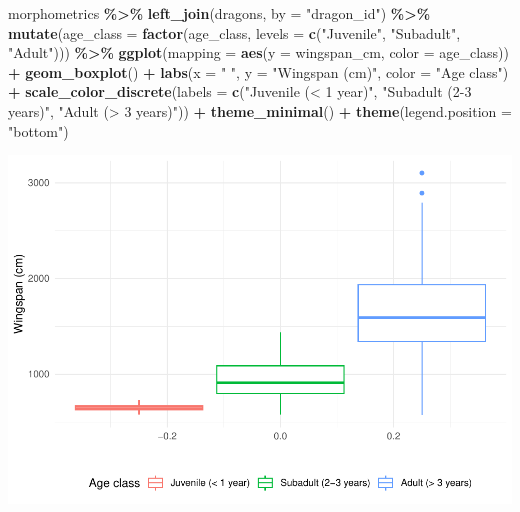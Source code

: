 \documentclass[
]{book}
\newenvironment{Shaded}{\begin{snugshade}}{\end{snugshade}}
\newcommand{\AttributeTok}[1]{\textcolor[rgb]{0.13,0.29,0.53}{#1}}
\newcommand{\FunctionTok}[1]{\textcolor[rgb]{0.13,0.29,0.53}{\textbf{#1}}}
\newcommand{\NormalTok}[1]{#1}
\newcommand{\SpecialCharTok}[1]{\textcolor[rgb]{0.81,0.36,0.00}{\textbf{#1}}}
\newcommand{\StringTok}[1]{\textcolor[rgb]{0.31,0.60,0.02}{#1}}
\begin{document}
\begin{Shaded}
\begin{Highlighting}[]
\NormalTok{morphometrics }\SpecialCharTok{\%\textgreater{}\%} 
  \FunctionTok{left\_join}\NormalTok{(dragons, }\AttributeTok{by =} \StringTok{"dragon\_id"}\NormalTok{) }\SpecialCharTok{\%\textgreater{}\%} 
  \FunctionTok{mutate}\NormalTok{(}\AttributeTok{age\_class =} \FunctionTok{factor}\NormalTok{(age\_class, }\AttributeTok{levels =} \FunctionTok{c}\NormalTok{(}\StringTok{"Juvenile"}\NormalTok{,}
                                                  \StringTok{"Subadult"}\NormalTok{,}
                                                  \StringTok{"Adult"}\NormalTok{))) }\SpecialCharTok{\%\textgreater{}\%} 
\FunctionTok{ggplot}\NormalTok{(}\AttributeTok{mapping =} \FunctionTok{aes}\NormalTok{(}\AttributeTok{y =}\NormalTok{ wingspan\_cm, }\AttributeTok{color =}\NormalTok{ age\_class)) }\SpecialCharTok{+}
  \FunctionTok{geom\_boxplot}\NormalTok{() }\SpecialCharTok{+}
  \FunctionTok{labs}\NormalTok{(}\AttributeTok{x =} \StringTok{" "}\NormalTok{, }\AttributeTok{y =} \StringTok{"Wingspan (cm)"}\NormalTok{, }\AttributeTok{color =} \StringTok{"Age class"}\NormalTok{) }\SpecialCharTok{+}
  \FunctionTok{scale\_color\_discrete}\NormalTok{(}\AttributeTok{labels =} \FunctionTok{c}\NormalTok{(}\StringTok{"Juvenile (\textless{} 1 year)"}\NormalTok{,}
                                 \StringTok{"Subadult (2{-}3 years)"}\NormalTok{,}
                                 \StringTok{"Adult (\textgreater{} 3 years)"}\NormalTok{)) }\SpecialCharTok{+}
  \FunctionTok{theme\_minimal}\NormalTok{() }\SpecialCharTok{+}
  \FunctionTok{theme}\NormalTok{(}\AttributeTok{legend.position =} \StringTok{"bottom"}\NormalTok{) }
\end{Highlighting}
\end{Shaded}

\includegraphics{reproducible-science_files/figure-latex/gg20-1.pdf}
\end{document}
